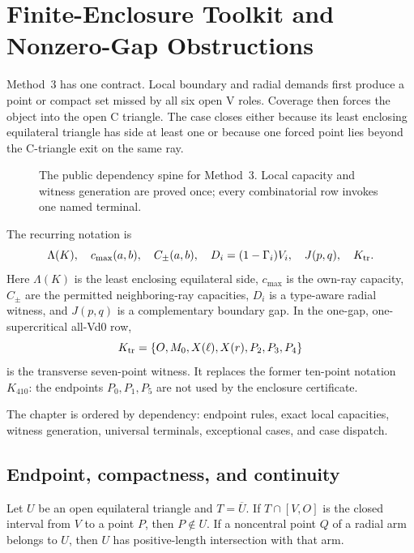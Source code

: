 \section{Finite-Enclosure Toolkit and Nonzero-Gap Obstructions}
\label{sec:finite-enclosure}

Method~3 has one contract.  Local boundary and radial demands first produce a
point or compact set missed by all six open V roles.  Coverage then forces the
object into the open C triangle.  The case closes either because its least
enclosing equilateral triangle has side at least one or because one forced
point lies beyond the C-triangle exit on the same ray.

\begin{figure}[H]
\centering
\resizebox{.98\linewidth}{!}{}
\caption{The public dependency spine for Method~3.  Local capacity and
witness generation are proved once; every combinatorial row invokes one named
terminal.}
\label{fig:finite-enclosure-spine}
\end{figure}

The recurring notation is
\[
 \Lambda(K),\quad c_{\max}(a,b),\quad C_\pm(a,b),\quad
 D_i=(1-\Gamma_i)V_i,\quad J(p,q),\quad K_{\rm tr}.
\]
Here $\Lambda(K)$ is the least enclosing equilateral side, $c_{\max}$ is the
own-ray capacity, $C_\pm$ are the permitted neighboring-ray capacities,
$D_i$ is a type-aware radial witness, and $J(p,q)$ is a complementary
boundary gap.  In the one-gap, one-supercritical all-Vd0 row,
\[
 K_{\rm tr}
 =
 \{O,M_0,X(\ell),X(r),P_2,P_3,P_4\}
\]
is the transverse seven-point witness.  It replaces the former ten-point
notation $K_{410}$: the endpoints $P_0,P_1,P_5$ are not used by the
enclosure certificate.

The chapter is ordered by dependency: endpoint rules, exact local capacities,
witness generation, universal terminals, exceptional cases, and case
dispatch.

\subsection{Endpoint, compactness, and continuity}
\label{subsec:new-endpoint-selector-audit}

\begin{lemma}
\label{lem:new-open-trace-endpoint}
Let $U$ be an open equilateral triangle and $T=\overline U$.  If
$T\cap[V,O]$ is the closed interval from $V$ to a point $P$, then
$P\notin U$.  If a noncentral point $Q$ of a radial arm belongs to $U$, then
$U$ has positive-length intersection with that arm.
\end{lemma}


